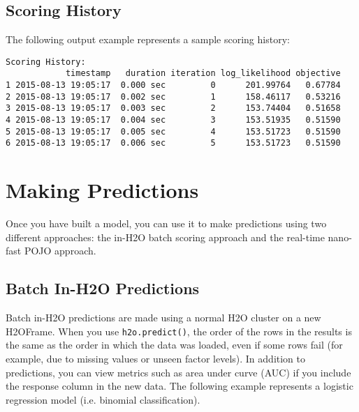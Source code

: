 \waterExampleInPython


\subsection{Scoring History}

The following output example represents a sample scoring history: 


\waterExampleInPython

\begin{lstlisting}[style=output]
Scoring History:
            timestamp   duration iteration log_likelihood objective
1 2015-08-13 19:05:17  0.000 sec         0      201.99764   0.67784
2 2015-08-13 19:05:17  0.002 sec         1      158.46117   0.53216
3 2015-08-13 19:05:17  0.003 sec         2      153.74404   0.51658
4 2015-08-13 19:05:17  0.004 sec         3      153.51935   0.51590
5 2015-08-13 19:05:17  0.005 sec         4      153.51723   0.51590
6 2015-08-13 19:05:17  0.006 sec         5      153.51723   0.51590
\end{lstlisting}




\section{Making Predictions}

Once you have built a model, you can use it to make predictions using two different approaches:  the in-H2O batch scoring approach and the real-time nano-fast POJO approach.

\subsection{Batch In-H2O Predictions}

Batch in-H2O predictions are made using a normal H2O cluster on a new H2OFrame.  When you use \texttt{h2o.predict()}, the order of the rows in the results is the same as the order in which the data was loaded, even if some rows fail (for example, due to missing values or unseen factor levels). 
In addition to predictions, you can view metrics such as area under curve (AUC) if you include the response column in the new data.  The following example represents a logistic regression model (i.e. binomial classification).

